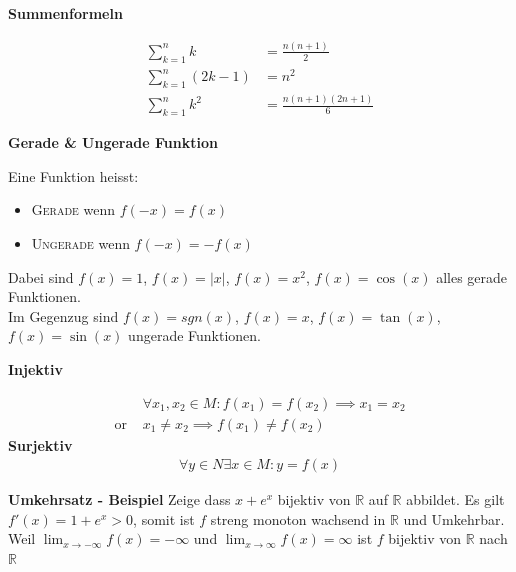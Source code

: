 \documentclass[25pt]{sciposter}
\newcommand{\R}{\mathbb{R}}
\newenvironment{method}[1]{\begin{mdframed}[backgroundcolor=blue!10,innertopmargin=15pt, innerbottommargin=15pt, nobreak=true]
		\textbf{#1 }
	}
	{ 
	\end{mdframed}
}
\begin{document}
\begin{multicols}{3}
\begin{method}{Summenformeln}
	\begin{align*}
	\sum _{{k=1}}^{n}k &= {\frac  {n(n+1)}{2}}\\
	\sum_{k=1}^n (2k-1) &= n^2\\
\sum _{{k=1}}^{n}k^{2} &= {\frac  {n(n+1)(2n+1)}{6}}
	\end{align*}
\end{method}


\begin{method}{Gerade \& Ungerade Funktion}
Eine Funktion heisst:
\begin{itemize}
	\item \textsc{Gerade} wenn $f(-x) = f(x)$
	\item \textsc{Ungerade} wenn $f(-x) = - f(x)$
\end{itemize}
Dabei sind $f(x) = 1$, $f(x) = |x|$, $f(x)=x^2$, $f(x) = \cos(x)$ alles gerade Funktionen.\\
Im Gegenzug sind $f(x) = sgn(x)$, $f(x) = x$, $f(x) = \tan(x)$, $f(x) = \sin(x)$ ungerade Funktionen.
\end{method}


\begin{method}{Injektiv}
	\begin{align*}
			&\forall x_1,x_2 \in M : f(x_1) = f(x_2) \implies x_1 = x_2\\
			\text{or }  &x_1 \not = x_2 \implies f(x_1) \not = f(x_2)
	\end{align*}
	\textbf{Surjektiv}
	\begin{align*}
	\forall y \in N \exists x \in M : y = f(x)
	\end{align*}
\end{method}

\textbf{Umkehrsatz - Beispiel} Zeige dass $x + e^x$ bijektiv von $\R$ auf $\R$ abbildet. Es gilt $f'(x) = 1 + e^x > 0$, somit ist $f$ streng monoton wachsend in $\R$ und Umkehrbar. Weil $\lim_{x \to -\infty} f(x) = - \infty$ und $\lim_{x \to \infty} f(x) = \infty$ ist $f$ bijektiv von $\R$ nach $\R$


\vfill\null
\columnbreak



\end{multicols}
\end{document}
